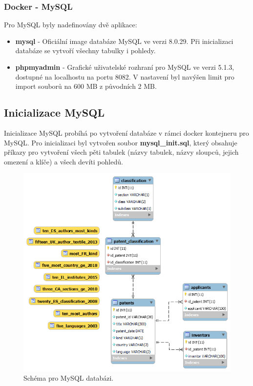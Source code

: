 \subsubsection{Docker - MySQL}
Pro MySQL byly nadefinovány dvě aplikace:
\begin{itemize}
\item \textbf{mysql} - Oficiální image databáze MySQL ve verzi 8.0.29. Při inicializaci databáze se vytvoří všechny tabulky i pohledy.
\item \textbf{phpmyadmin} - Grafické uživatelské rozhraní pro MySQL ve verzi 5.1.3, dostupné na localhostu na portu 8082. V nastavení byl navýšen limit pro import souborů na 600 MB z původních 2 MB.
\end{itemize}

\subsection{Inicializace MySQL}
Inicializace MySQL probíhá po vytvoření databáze v rámci docker kontejneru pro MySQL. Pro inicializaci byl vytvořen soubor \textbf{mysql\_init.sql}, který obsahuje příkazy pro vytvoření všech pěti tabulek (názvy tabulek, názvy sloupců, jejich omezení a klíče) a všech devíti pohledů.
\begin{figure}[H]
\centering
\includegraphics[width=12cm]{img/eer}
\caption{Schéma pro MySQL databázi.}
\label{fig:mysql_schema}
\end{figure}

%

